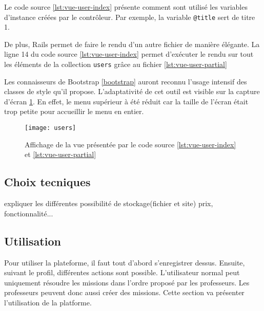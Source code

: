 
Le code source \ref{lst:vue-user-index} présente comment sont utilisé les variables d'instance créées par le contrôleur. Par exemple, la variable \texttt{@title} sert de titre 1.


De plus, Rails permet de faire le rendu d'un autre fichier de manière élégante. La ligne 14 du code source \ref{lst:vue-user-index} permet d'exécuter le rendu sur tout les éléments de la collection \texttt{users} grâce au fichier \ref{lst:vue-user-partial}

Les connaisseurs de Bootstrap \ref{bootstrap} auront reconnu l'usage intensif des classes de style qu'il propose. L'adaptativité de cet outil est visible sur la capture d'écran \ref{fig:vue-users}. En effet, le menu supérieur à été réduit car la taille de l'écran était trop petite pour accueillir le menu en entier.

\begin{figure}
  \begin{center}
    \texttt{[image: users]}
    \caption{Affichage de la vue présentée par le code source \ref{lst:vue-user-index} et \ref{lst:vue-user-partial}}
    \label{fig:vue-users}
  \end{center}
\end{figure}

\subsection{Choix tecniques}
expliquer les différentes possibilité de stockage(fichier et site) prix, fonctionnalité...

\subsection{Utilisation}
Pour utiliser la plateforme, il faut tout d'abord s'enregistrer dessus. Ensuite, suivant le profil, différentes actions sont possible. L'utilisateur normal peut uniquement résoudre les missions dans l'ordre proposé par les professeurs. Les professeurs peuvent donc aussi créer des missions. Cette section va présenter l'utilisation de la platforme.

